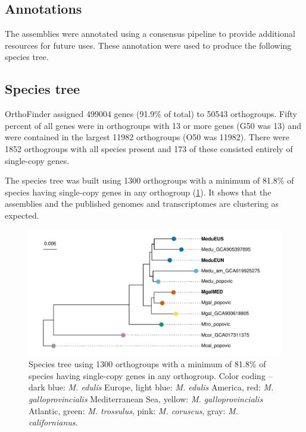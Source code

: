 \documentclass[11pt, a4paper]{article}
\begin{document}
\subsection{Annotations}

The assemblies were annotated using a consensus pipeline to provide additional resources for future uses.
These annotation were used to produce the following species tree.

\subsection{Species tree}

OrthoFinder assigned 499004 genes (91.9\% of total) to 50543 orthogroups. Fifty percent of all 
genes were in orthogroups with 13 or more genes (G50 was 13) and were contained in the largest
11982 orthogroups (O50 was 11982). There were 1852 orthogroups with all species present and 
173 of these consisted entirely of single-copy genes.

The species tree was built using 1300 orthogroups with a minimum of 81.8\% of species having single-copy genes in any orthogroup (\cref{fig:tree}).
It shows that the assemblies and the published genomes and transcriptomes are clustering as expected.

\begin{figure}[h]
	\includegraphics[width=\linewidth]{figures/Fig3_tree.pdf}
	\caption{Species tree using 1300 orthogroups with a minimum of 81.8\% of species having single-copy genes in any orthogroup.
	Color coding -- dark blue: \textit{M. edulis} Europe, light blue: \textit{M. edulis} America,
	red: \textit{M. galloprovincialis} Mediterranean Sea, yellow: \textit{M. galloprovincialis} Atlantic,
	green: \textit{M. trossulus}, pink: \textit{M. coruscus}, gray: \textit{M. californianus}.
	}
	\label{fig:tree}
\end{figure}
\end{document}
